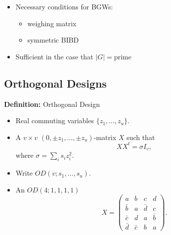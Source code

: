 \documentclass{beamer}
\newcommand{\abs}[1]{|#1|}
\begin{document}
\begin{frame}

  \begin{itemize}
  \item Necessary conditions for BGWs:
    \begin{itemize}
    \item weighing matrix
    \item symmetric BIBD
    \end{itemize}
  \item Sufficient in the case that $\abs{G} = \text{prime}$ \cite[][]{lam-leung}
  \end{itemize}

\end{frame}


\subsection{Orthogonal Designs}

\begin{frame}

  \begin{block}{{\bf Definition:} Orthogonal Design}
    \begin{itemize}
    \item Real commuting variables $\{z_1, \dots, z_u\}$.
    \item A $v \times v$ $(0,\pm z_1, \dots, \pm z_u)$-matrix $X$ such that
      \[
        XX^t = \sigma I_v,
      \]
      where $\sigma = \sum_i s_iz_i^2$.
    \item Write $OD(v; s_1, \dots, s_u)$.
    \end{itemize}
  \end{block}
  
\end{frame}

\begin{frame}

  \begin{itemize}
  \item An $OD(4;1,1,1,1)$
    \[
      X = 
      \begin{pmatrix}
        a & b & c & d \\
        \bar b & a & \bar d & c \\
        \bar c & d & a & \bar b \\
        \bar d & \bar c & b & a
      \end{pmatrix}.
    \]
  \end{itemize}
  
\end{frame}
\end{document}
